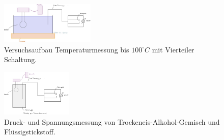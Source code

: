 \begin{figure}[h!]
    \centering
    \includegraphics[width=0.4\textwidth]{img/41/2.jpg}
    \caption{Versuchsaufbau Temperaturmessung bis $100^\circ C$ mit Vierteiler Schaltung.}
\end{figure}

\begin{figure}[h!]
    \centering
    \includegraphics[width=0.3\textwidth]{img/41/3.jpg}
    \caption{Druck- und Spannungsmessung von Trockeneis-Alkohol-Gemisch und Flüssigstickstoff.}
\end{figure}


